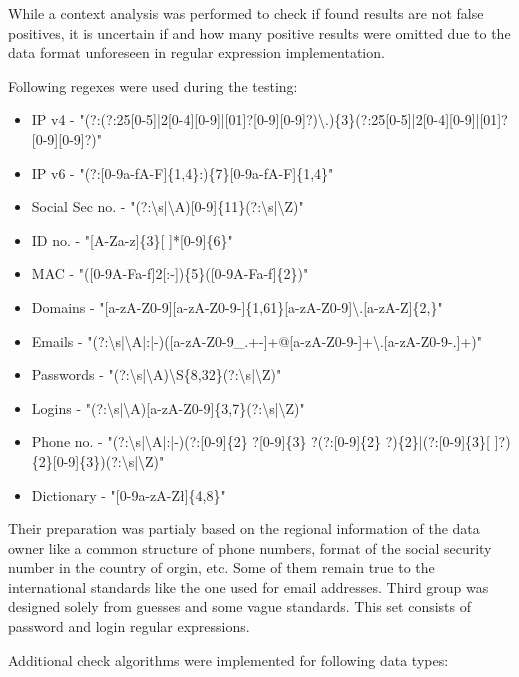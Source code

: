 \documentclass[a4paper,twoside,12pt]{book}
\begin{document}
While a context analysis was performed to check if found results are not false positives, it is uncertain if and how many
positive results were omitted due to the data format unforeseen in regular expression implementation. 

Following regexes were used during the testing: 

\begin{itemize}
   \item IP v4 - "(?:(?:25[0-5]|2[0-4][0-9]|[01]?[0-9][0-9]?)\textbackslash .)\{3\}(?:25[0-5]|2[0-4][0-9]|[01]?[0-9][0-9]?)" 
   \item IP v6 - "(?:[0-9a-fA-F]\{1,4\}:)\{7\}[0-9a-fA-F]\{1,4\}"
   \item Social Sec no. - "(?:\textbackslash s|\textbackslash A)[0-9]\{11\}(?:\textbackslash s|\textbackslash Z)"
   \item ID no. - "[A-Za-z]\{3\}[ ]*[0-9]\{6\}"
   \item MAC - "([0-9A-Fa-f]{2}[:-])\{5\}([0-9A-Fa-f]\{2\})"
   \item Domains - "[a-zA-Z0-9][a-zA-Z0-9-]\{1,61\}[a-zA-Z0-9]\textbackslash .[a-zA-Z]\{2,\}"
   \item Emails - "(?:\textbackslash s|\textbackslash A|:|-)([a-zA-Z0-9\_.+-]+@[a-zA-Z0-9-]+\textbackslash .[a-zA-Z0-9-.]+)"
   \item Passwords - "(?:\textbackslash s|\textbackslash A)\textbackslash S\{8,32\}(?:\textbackslash s|\textbackslash Z)"
   \item Logins - "(?:\textbackslash s|\textbackslash A)[a-zA-Z0-9]\{3,7\}(?:\textbackslash s|\textbackslash Z)"
   \item Phone no. - "(?:\textbackslash s|\textbackslash A|:|-)(?:[0-9]\{2\} ?[0-9]\{3\} ?(?:[0-9]\{2\} ?)\{2\}|(?:[0-9]\{3\}[ ]?)\{2\}[0-9]\{3\})(?:\textbackslash s|\textbackslash Z)"
   \item Dictionary - "[0-9a-zA-Zł]\{4,8\}"
\end{itemize}

Their preparation was partialy based on the regional information of the data owner like a common structure of phone numbers, format of the social security number in the
country of orgin, etc. Some of them remain true to the international standards like the one used for email addresses. Third group was designed solely from guesses and
some vague standards. This set consists of password and login regular expressions.

Additional check algorithms were implemented for following data types:
\end{document}
